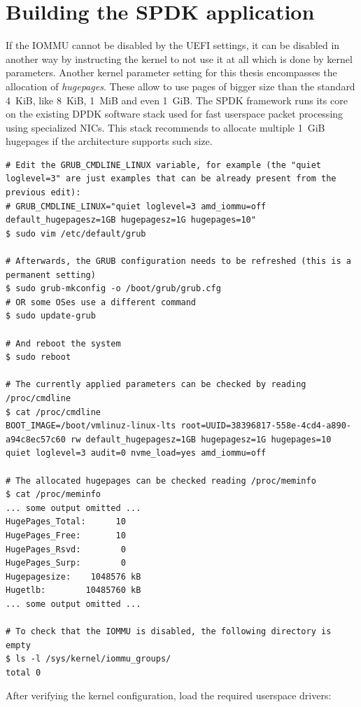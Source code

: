 \section{Building the SPDK application}

If the IOMMU cannot be disabled by the UEFI settings, it can be disabled in another way by
instructing the kernel to not use it at all which is done by kernel parameters. Another kernel
parameter setting for this thesis encompasses the allocation of \emph{hugepages}. These allow to use
pages of bigger size than the standard 4~KiB, like 8~KiB, 1~MiB and even
1~GiB\cite{kernel_hugepages}. The \ac{SPDK} framework runs its core on the existing \ac{DPDK}
software stack used for fast userspace packet processing using specialized \acp{NIC}. This stack
recommends to allocate multiple 1~GiB hugepages if the architecture supports such
size\cite{dpdk_hugepages}.

\begin{lstlisting}[caption={Setting kernel command line parameters}]
# Edit the GRUB_CMDLINE_LINUX variable, for example (the "quiet loglevel=3" are just examples that can be already present from the previous edit):
# GRUB_CMDLINE_LINUX="quiet loglevel=3 amd_iommu=off default_hugepagesz=1GB hugepagesz=1G hugepages=10"
$ sudo vim /etc/default/grub

# Afterwards, the GRUB configuration needs to be refreshed (this is a permanent setting)
$ sudo grub-mkconfig -o /boot/grub/grub.cfg
# OR some OSes use a different command
$ sudo update-grub

# And reboot the system
$ sudo reboot

# The currently applied parameters can be checked by reading /proc/cmdline
$ cat /proc/cmdline
BOOT_IMAGE=/boot/vmlinuz-linux-lts root=UUID=38396817-558e-4cd4-a890-a94c8ec57c60 rw default_hugepagesz=1GB hugepagesz=1G hugepages=10 quiet loglevel=3 audit=0 nvme_load=yes amd_iommu=off

# The allocated hugepages can be checked reading /proc/meminfo
$ cat /proc/meminfo
... some output omitted ...
HugePages_Total:      10
HugePages_Free:       10
HugePages_Rsvd:        0
HugePages_Surp:        0
Hugepagesize:    1048576 kB
Hugetlb:        10485760 kB
... some output omitted ...

# To check that the IOMMU is disabled, the following directory is empty
$ ls -l /sys/kernel/iommu_groups/
total 0
\end{lstlisting}

After verifying the kernel configuration, load the required userspace drivers:

